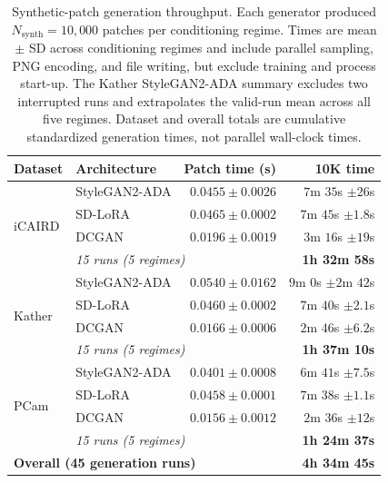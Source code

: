 \begin{table}[htbp]
\centering
\footnotesize
\setlength{\tabcolsep}{4pt}
\renewcommand{\arraystretch}{1.05}
\begin{tabular}{@{}llrr@{}}
\toprule
Dataset & Architecture & Patch time (s) & 10K time \\
\midrule
\multirow{4}{*}{iCAIRD}
& StyleGAN2-ADA & $0.0455 \pm 0.0026$ & $7$m $35$s $\pm 26$s \\
& SD-LoRA       & $0.0465 \pm 0.0002$ & $7$m $45$s $\pm 1.8$s \\
& DCGAN         & $0.0196 \pm 0.0019$ & $3$m $16$s $\pm 19$s \\
\cmidrule(lr){2-4}
& \multicolumn{2}{l}{\textit{15 runs (5 regimes)}}
& \textbf{1h 32m 58s} \\
\midrule
\multirow{4}{*}{Kather}
& StyleGAN2-ADA & $0.0540 \pm 0.0162$ & $9$m $0$s $\pm 2$m $42$s \\
& SD-LoRA       & $0.0460 \pm 0.0002$ & $7$m $40$s $\pm 2.1$s \\
& DCGAN         & $0.0166 \pm 0.0006$ & $2$m $46$s $\pm 6.2$s \\
\cmidrule(lr){2-4}
& \multicolumn{2}{l}{\textit{15 runs (5 regimes)}}
& \textbf{1h 37m 10s} \\
\midrule
\multirow{4}{*}{PCam}
& StyleGAN2-ADA & $0.0401 \pm 0.0008$ & $6$m $41$s $\pm 7.5$s \\
& SD-LoRA       & $0.0458 \pm 0.0001$ & $7$m $38$s $\pm 1.1$s \\
& DCGAN         & $0.0156 \pm 0.0012$ & $2$m $36$s $\pm 12$s \\
\cmidrule(lr){2-4}
& \multicolumn{2}{l}{\textit{15 runs (5 regimes)}}
& \textbf{1h 24m 37s} \\
\midrule
\multicolumn{3}{l}{\textbf{Overall (45 generation runs)}}
& \textbf{4h 34m 45s} \\
\bottomrule
\end{tabular}
\caption{Synthetic-patch generation throughput.
Each generator produced $N_{\mathrm{synth}}=10{,}000$ patches per conditioning
regime. Times are mean $\pm$ SD across conditioning regimes and include parallel
sampling, PNG encoding, and file writing, but exclude training and process
start-up. The Kather StyleGAN2-ADA summary excludes two interrupted runs and extrapolates the
valid-run mean across all five regimes. Dataset and overall totals are
cumulative standardized generation times, not parallel wall-clock times.}
\label{tab:compact-generation-utility-sizes}
\end{table}
